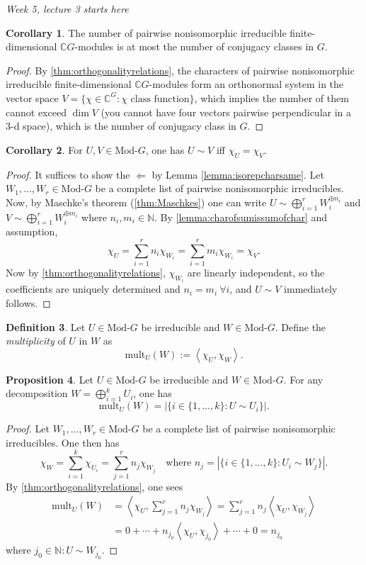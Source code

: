 \documentclass{article}
\newcommand{\mult}{\text{mult}}
\newcommand{\la}{\left\langle}
\newcommand{\ra}{\right\rangle}
\newcommand{\N}{\mathbb{N}}
\newcommand{\C}{\mathbb{C}}
\newcommand{\Mod}{\text{Mod-}}
\theoremstyle{definition}
\newtheorem{defn}{Definition}[subsection]
\newtheorem{prop}[defn]{Proposition}
\newtheorem{coro}[defn]{Corollary}
\begin{document}
\begin{flushright}
\textit{Week 5, lecture 3 starts here}
\end{flushright}

\begin{coro}
\label{coro:nofpwniirfdisatmostnofconjclas}
The number of pairwise nonisomorphic irreducible finite-dimensional $\C G$-modules is at most the number of conjugacy classes in $G$.
\end{coro}
\begin{proof}
By \ref{thm:orthogonalityrelations}, the characters of pairwise nonisomorphic irreducible finite-dimensional $\C G$-modules form an orthonormal system in the vector space $V=\{\chi\in\C^G:\chi\text{ class function}\}$, which implies the number of them cannot exceed $\dim V$ (you cannot have four vectors pairwise perpendicular in a 3-d space), which is the number of conjugacy class in $G$.
\end{proof}

\begin{coro}
\label{coro:convisorepcharsame}
For $U,V\in\Mod G$, one has $U\sim V$ iff $\chi_U=\chi_V$.
\end{coro}
\begin{proof}
It suffices to show the $\Leftarrow$ by Lemma \ref{lemma:isorepcharsame}. Let $W_1,\ldots,W_r\in\Mod G$ be a complete list of pairwise nonisomorphic irreducibles. Now, by Maschke's theorem (\ref{thm:Maschkes}) one can write $U\sim\bigoplus_{i=1}^r W_i^{\oplus n_i}$ and $V\sim\bigoplus_{i=1}^r W_i^{\oplus m_i}$ where $n_i,m_i\in\N$. By \ref{lemma:charofsumissumofchar} and assumption,
\[
\chi_U=\sum_{i=1}^r n_i \chi_{W_i}=\sum_{i=1}^r m_i \chi_{W_i}=\chi_V.
\]
Now by \ref{thm:orthogonalityrelations}, $\chi_{W_i}$ are linearly independent, so the coefficients are uniquely determined and $n_i=m_i \ \forall i$, and $U\sim V$ immediately follows.
\end{proof}

\begin{defn}
Let $U\in\Mod G$ be irreducible and $W\in\Mod G$. Define the \textit{multiplicity} of $U$ in $W$ as
\[
\mult_U(W):=\la \chi_U,\chi_W\ra.
\]
\end{defn}

\begin{prop}
Let $U\in\Mod G$ be irreducible and $W\in\Mod G$. For any decomposition $W=\bigoplus_{i=1}^k U_i$, one has
\[
\mult_U(W)=|\{i\in\{1,\ldots,k\}:U\sim U_i\}|.
\]
\end{prop}
\begin{proof}
Let $W_1,\ldots,W_r\in\Mod G$ be a complete list of pairwise nonisomorphic irreducibles. One then has
\[
\chi_W=\sum_{i=1}^k \chi_{U_i}=\sum_{j=1}^r n_j \chi_{W_j} \quad\text{where }n_j=|\{i\in\{1,\ldots,k\}:U_i\sim W_j\}|.
\]
By \ref{thm:orthogonalityrelations}, one sees
\[
\begin{aligned}
\mult_U(W)&=\la\chi_U,\sum_{j=1}^r n_j \chi_{W_j}\ra=\sum_{j=1}^r n_j\la\chi_U,\chi_{W_j}\ra\\
&=0+\cdots+n_{j_0}\la\chi_U,\chi_{j_0}\ra+\cdots+0=n_{j_0}
\end{aligned}
\]
where $j_0\in\N:U\sim W_{j_0}$.
\end{proof}
\end{document}
